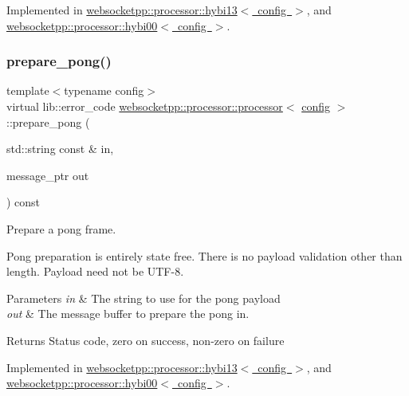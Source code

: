 Implemented in \mbox{\hyperlink{classwebsocketpp_1_1processor_1_1hybi13_a38d06bc30c10cd1947c9a7b3051f8961}{websocketpp\+::processor\+::hybi13$<$ config $>$}}, and \mbox{\hyperlink{classwebsocketpp_1_1processor_1_1hybi00_a19b26fd77f07fb74cf654c5c6976cac3}{websocketpp\+::processor\+::hybi00$<$ config $>$}}.

\mbox{\label{classwebsocketpp_1_1processor_1_1processor_afc8206bfe447a461d0e30a969b0af859}} 
\subsubsection{\texorpdfstring{prepare\+\_\+pong()}{prepare\_pong()}}
{\footnotesize\ttfamily template$<$typename config$>$ \\
virtual lib\+::error\+\_\+code \mbox{\hyperlink{classwebsocketpp_1_1processor_1_1processor}{websocketpp\+::processor\+::processor}}$<$ \mbox{\hyperlink{classconfig}{config}} $>$\+::prepare\+\_\+pong (\begin{DoxyParamCaption}\item[{std\+::string const \&}]{in,  }\item[{message\+\_\+ptr}]{out }\end{DoxyParamCaption}) const\hspace{0.3cm}{\ttfamily [pure virtual]}}



Prepare a pong frame. 

Pong preparation is entirely state free. There is no payload validation other than length. Payload need not be U\+T\+F-\/8.


\begin{DoxyParams}{Parameters}
{\em in} & The string to use for the pong payload \\
\hline
{\em out} & The message buffer to prepare the pong in. \\
\hline
\end{DoxyParams}
\begin{DoxyReturn}{Returns}
Status code, zero on success, non-\/zero on failure 
\end{DoxyReturn}


Implemented in \mbox{\hyperlink{classwebsocketpp_1_1processor_1_1hybi13_ab5ca972653c126e7c6a05c529b394321}{websocketpp\+::processor\+::hybi13$<$ config $>$}}, and \mbox{\hyperlink{classwebsocketpp_1_1processor_1_1hybi00_a1c9e4bf4f5b73e61bee7950c439a77db}{websocketpp\+::processor\+::hybi00$<$ config $>$}}.

